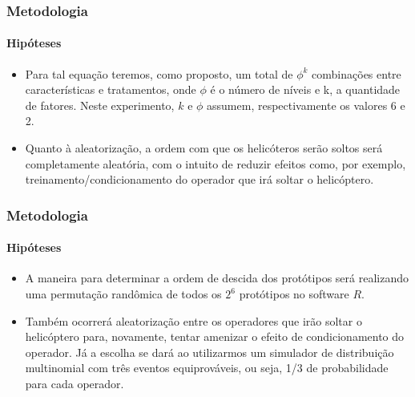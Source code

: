 \documentclass{beamer}
\begin{document}
      \begin{frame}
         \frametitle{Metodologia}
            \framesubtitle{Hipóteses}
               \begin{itemize}
                  \item Para tal equação teremos, como proposto, um total de $\phi^k$ combinações entre características e tratamentos, onde $\phi$ é o número de níveis e k, a quantidade de fatores. Neste experimento, $k$ e $\phi$ assumem, respectivamente os valores 6 e 2.

                  \item Quanto à aleatorização, a ordem com que os helicóteros serão soltos será completamente aleatória, com o intuito de reduzir efeitos como, por exemplo, treinamento/condicionamento do operador que irá soltar o helicóptero.

               \end{itemize}
      \end{frame}

      \begin{frame}
         \frametitle{Metodologia}
            \framesubtitle{Hipóteses}
               \begin{itemize}
                  \item A maneira para determinar a ordem de descida dos protótipos será realizando uma permutação randômica de todos os $2^6$ protótipos no software $R$.

                  \item Também ocorrerá aleatorização entre os operadores que irão soltar o helicóptero para, novamente, tentar amenizar o efeito de condicionamento do operador. Já a escolha se dará ao utilizarmos um simulador de distribuição multinomial com três eventos equiprováveis, ou seja, 1/3 de probabilidade para cada operador.
               \end{itemize}
      \end{frame}
\end{document}
